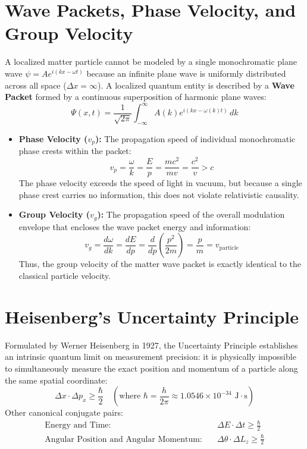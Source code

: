 \section{Wave Packets, Phase Velocity, and Group Velocity}
A localized matter particle cannot be modeled by a single monochromatic plane wave $\psi = A e^{i(kx - \omega t)}$ because an infinite plane wave is uniformly distributed across all space ($\Delta x = \infty$). A localized quantum entity is described by a \textbf{Wave Packet} formed by a continuous superposition of harmonic plane waves:
\begin{equation}
\Psi(x,t) = \frac{1}{\sqrt{2\pi}}\int_{-\infty}^{\infty} A(k) e^{i(kx - \omega(k) t)} \, dk
\end{equation}
\begin{itemize}[leftmargin=*,itemsep=3pt]
    \item \textbf{Phase Velocity ($v_p$):} The propagation speed of individual monochromatic phase crests within the packet:
    \begin{equation}
    v_p = \frac{\omega}{k} = \frac{E}{p} = \frac{mc^2}{mv} = \frac{c^2}{v} > c
    \end{equation}
    The phase velocity exceeds the speed of light in vacuum, but because a single phase crest carries no information, this does not violate relativistic causality.
    \item \textbf{Group Velocity ($v_g$):} The propagation speed of the overall modulation envelope that encloses the wave packet energy and information:
    \begin{equation}
    v_g = \frac{d\omega}{dk} = \frac{dE}{dp} = \frac{d}{dp}\left(\frac{p^2}{2m}\right) = \frac{p}{m} = v_{\text{particle}}
    \end{equation}
    Thus, the group velocity of the matter wave packet is exactly identical to the classical particle velocity.
\end{itemize}

\section{Heisenberg's Uncertainty Principle}
Formulated by Werner Heisenberg in 1927, the Uncertainty Principle establishes an intrinsic quantum limit on measurement precision: it is physically impossible to simultaneously measure the exact position and momentum of a particle along the same spatial coordinate:
\begin{equation}
\Delta x \cdot \Delta p_x \ge \frac{\hbar}{2} \quad \left(\text{where } \hbar = \frac{h}{2\pi} \approx 1.0546 \times 10^{-34}\text{ J}\cdot\text{s}\right)
\end{equation}
Other canonical conjugate pairs:
\begin{align}
\text{Energy and Time:} \quad & \Delta E \cdot \Delta t \ge \frac{\hbar}{2} \\
\text{Angular Position and Angular Momentum:} \quad & \Delta \theta \cdot \Delta L_z \ge \frac{\hbar}{2}
\end{align}

